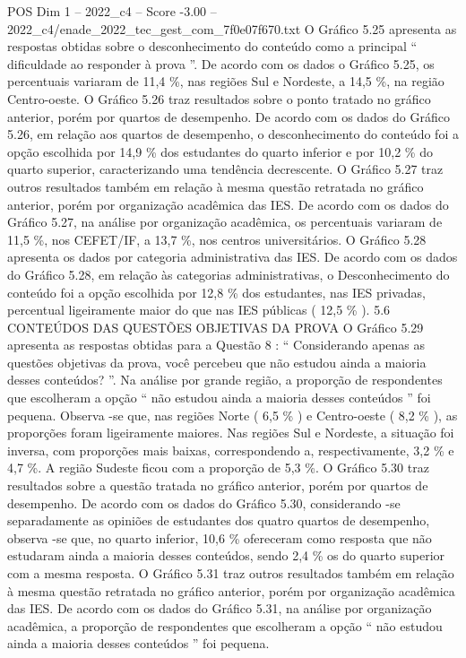 \begin{textsample}{POS Dim 1 – 2022\_c4 – Score -3.00 – 2022\_c4/enade\_2022\_tec\_gest\_com\_7f0e07f670.txt}
O Gráfico 5.25 apresenta as respostas obtidas sobre o desconhecimento do conteúdo como a principal “ dificuldade ao responder à prova ”.
De acordo com os dados o Gráfico 5.25, os percentuais variaram de 11,4 \%, nas regiões Sul e Nordeste, a 14,5 \%, na região Centro-oeste.
O Gráfico 5.26 traz resultados sobre o ponto tratado no gráfico anterior, porém por quartos de desempenho.
De acordo com os dados do Gráfico 5.26, em relação aos quartos de desempenho, o desconhecimento do conteúdo foi a opção escolhida por 14,9 \% dos estudantes do quarto inferior e por 10,2 \% do quarto superior, caracterizando uma tendência decrescente.
O Gráfico 5.27 traz outros resultados também em relação à mesma questão retratada no gráfico anterior, porém por organização acadêmica das IES.
De acordo com os dados do Gráfico 5.27, na análise por organização acadêmica, os percentuais variaram de 11,5 \%, nos CEFET/IF, a 13,7 \%, nos centros universitários.
O Gráfico 5.28 apresenta os dados por categoria administrativa das IES.
De acordo com os dados do Gráfico 5.28, em relação às categorias administrativas, o Desconhecimento do conteúdo foi a opção escolhida por 12,8 \% dos estudantes, nas IES privadas, percentual ligeiramente maior do que nas IES públicas ( 12,5 \% ). 5.6 CONTEÚDOS DAS QUESTÕES OBJETIVAS DA PROVA O Gráfico 5.29 apresenta as respostas obtidas para a Questão 8 : “ Considerando apenas as questões objetivas da prova, você percebeu que não estudou ainda a maioria desses conteúdos? ”.
Na análise por grande região, a proporção de respondentes que escolheram a opção “ não estudou ainda a maioria desses conteúdos ” foi pequena.
Observa -se que, nas regiões Norte ( 6,5 \% ) e Centro-oeste ( 8,2 \% ), as proporções foram ligeiramente maiores.
Nas regiões Sul e Nordeste, a situação foi inversa, com proporções mais baixas, correspondendo a, respectivamente, 3,2 \% e 4,7 \%.
A região Sudeste ficou com a proporção de 5,3 \%.
O Gráfico 5.30 traz resultados sobre a questão tratada no gráfico anterior, porém por quartos de desempenho.
De acordo com os dados do Gráfico 5.30, considerando -se separadamente as opiniões de estudantes dos quatro quartos de desempenho, observa -se que, no quarto inferior, 10,6 \% ofereceram como resposta que não estudaram ainda a maioria desses conteúdos, sendo 2,4 \% os do quarto superior com a mesma resposta.
O Gráfico 5.31 traz outros resultados também em relação à mesma questão retratada no gráfico anterior, porém por organização acadêmica das IES.
De acordo com os dados do Gráfico 5.31, na análise por organização acadêmica, a proporção de respondentes que escolheram a opção “ não estudou ainda a maioria desses conteúdos ” foi pequena.

\end{textsample}

